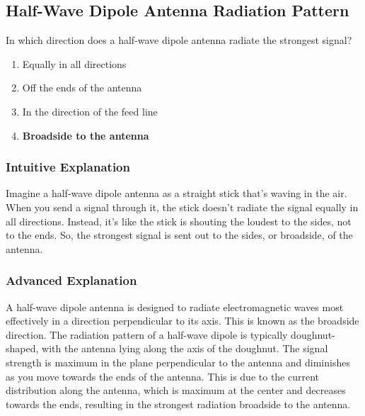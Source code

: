 \subsection{Half-Wave Dipole Antenna Radiation Pattern}
\label{T9A10}

\begin{tcolorbox}[colback=gray!10!white,colframe=black!75!black,title=T9A10]
In which direction does a half-wave dipole antenna radiate the strongest signal?
\begin{enumerate}[noitemsep]
    \item Equally in all directions
    \item Off the ends of the antenna
    \item In the direction of the feed line
    \item \textbf{Broadside to the antenna}
\end{enumerate}
\end{tcolorbox}

\subsubsection*{Intuitive Explanation}
Imagine a half-wave dipole antenna as a straight stick that's waving in the air. When you send a signal through it, the stick doesn't radiate the signal equally in all directions. Instead, it's like the stick is shouting the loudest to the sides, not to the ends. So, the strongest signal is sent out to the sides, or broadside, of the antenna.

\subsubsection*{Advanced Explanation}
A half-wave dipole antenna is designed to radiate electromagnetic waves most effectively in a direction perpendicular to its axis. This is known as the broadside direction. The radiation pattern of a half-wave dipole is typically doughnut-shaped, with the antenna lying along the axis of the doughnut. The signal strength is maximum in the plane perpendicular to the antenna and diminishes as you move towards the ends of the antenna. This is due to the current distribution along the antenna, which is maximum at the center and decreases towards the ends, resulting in the strongest radiation broadside to the antenna.